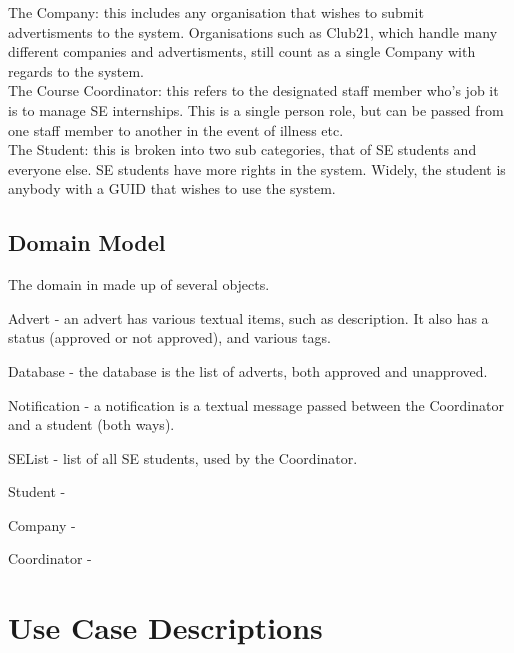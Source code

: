 \documentclass{l3deliverable}
\begin{document}
The Company: this includes any organisation that wishes to submit 
advertisments to the system. Organisations such as Club21, which handle
many different companies and advertisments, still count as a single Company
with regards to the system.\\

The Course Coordinator: this refers to the designated staff member who's job
it is to manage SE internships. This is a single person role, but can be 
passed from one staff member to another in the event of illness etc.\\

The Student: this is broken into two sub categories, that of SE students and
everyone else. SE students have more rights in the system. Widely, the student
is anybody with a GUID that wishes to use the system.\\


\subsection{Domain Model}


The domain in made up of several objects.

Advert - an advert has various textual items, such as description. It also
has a status (approved or not approved), and various tags.

Database - the database is the list of adverts, both approved and unapproved.

Notification - a notification is a textual message passed between the 
Coordinator and a student (both ways).

SEList - list of all SE students, used by the Coordinator. 

Student - 

Company - 

Coordinator -


\section{Use Case Descriptions}

\end{document}
